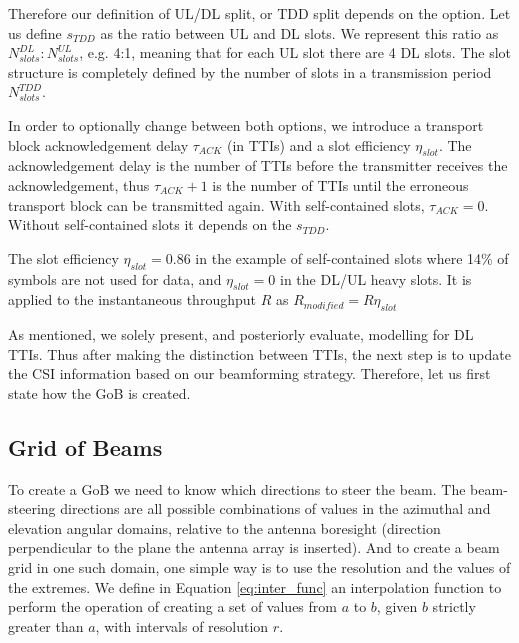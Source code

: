 Therefore our definition of \ac{UL}/\ac{DL} split, or \ac{TDD} split depends on the option. Let us define $s_{TDD}$ as the ratio between UL and DL slots. We represent this ratio as $N^{DL}_{slots} : N^{UL}_{slots}$, e.g. 4:1, meaning that for each UL slot there are 4 DL slots. The slot structure is completely defined by the number of slots in a transmission period $N^{TDD}_{slots}$.

In order to optionally change between both options, we introduce a transport block acknowledgement delay $\tau_{ACK}$ (in TTIs)  and a slot efficiency $\eta_{slot}$. The acknowledgement delay is the number of TTIs before the transmitter receives the acknowledgement, thus $\tau_{ACK} + 1$ is the number of TTIs until the erroneous transport block can be transmitted again. With self-contained slots, $\tau_{ACK} = 0$. Without self-contained slots it depends on the $s_{TDD}$.

The slot efficiency $\eta_{slot} = 0.86$ in the example of self-contained slots where 14\% of symbols are not used for data, and $\eta_{slot} = 0$ in the DL/UL heavy slots. It is applied to the instantaneous throughput $R$ as $R_{modified} = R \eta_{slot}$

\begin{comment}
Equations \eqref{eq:tdd_split} and \eqref{eq:slot_per}.

\begin{align}
    s_\text{TDD} &= N^\text{DL}_\text{slots} \ / \ N^\text{UL}_\text{slots} \label{eq:tdd_split} \\
    P_\text{slot} &= N^\text{DL}_\text{slots} + N^\text{UL}_\text{slots} \label{eq:slot_per}
\end{align}
\end{comment}

As mentioned, we solely present, and posteriorly evaluate, modelling for DL TTIs. Thus after making the distinction between TTIs, the next step is to update the CSI information based on our beamforming strategy. Therefore, let us first state how the \ac{GoB} is created.

\subsection*{Grid of Beams}
\label{sec:GoB}

To create a GoB we need to know which directions to steer the beam. The beam-steering directions are all possible combinations of values in the azimuthal and elevation angular domains, relative to the antenna boresight (direction perpendicular to the plane the antenna array is inserted). And to create a beam grid in one such domain, one simple way is to use the resolution and the values of the extremes. We define in Equation \eqref{eq:inter_func} an interpolation function to perform the operation of creating a set of values from $a$ to $b$, given $b$ strictly greater than $a$, with intervals of resolution $r$.


